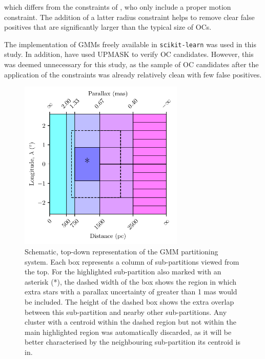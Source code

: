 \noindent
which differs from the constraints of \cite{cantat-gaudin_gaia_2019}, who only include a proper motion constraint. The addition of a latter radius constraint helps to remove clear false positives that are significantly larger than the typical size of OCs.

The implementation of GMMs freely available in \texttt{scikit-learn} \citep{pedregosa_scikit-learn_2011} was used in this study. In addition, \cite{cantat-gaudin_gaia_2019} have used UPMASK \citep{krone-martins_upmask:_2014} to verify OC candidates. However, this was deemed unnecessary for this study, as the sample of OC candidates after the application of the constraints was already relatively clean with few false positives.

\begin{figure}[t]
   \centering
   \includegraphics[width=0.7\textwidth]{fig/c2/fig_gmm.pdf}
   \caption[Schematic, top-down representation of the GMM partitioning system]{Schematic, top-down representation of the GMM partitioning system. Each box represents a column of sub-partitions viewed from the top. For the highlighted sub-partition also marked with an asterisk (*), the dashed width of the box shows the region in which extra stars with a parallax uncertainty of greater than 1 mas would be included. The height of the dashed box shows the extra overlap between this sub-partition and nearby other sub-partitions. Any cluster with a centroid within the dashed region but not within the main highlighted region was automatically discarded, as it will be better characterised by the neighbouring sub-partition its centroid is in.}\label{c2:fig:gmm}%
\end{figure}


